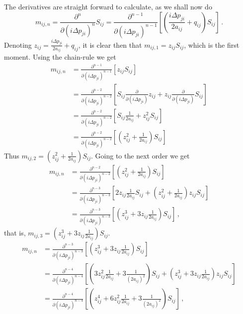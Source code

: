 \documentclass[a4paper, 11pt]{scrartcl}
\newcommand{\parenths}[1]{\left(#1\right)}
\newcommand{\sqbrackets}[1]{\left[#1\right]}
\begin{document}
The derivatives are straight forward to calculate, as we shall now do 
\begin{equation}
    m_{ij, n} = \frac{\partial^n}{\partial (i\Delta p_{ji})^n} S_{ij} 
    = \frac{\partial^{n-1}}{\partial (i\Delta p_{ji})^{n-1}} 
    \sqbrackets{\parenths{\frac{i\Delta p_{ji}}{2 a_{ij}} + q_{ij}} S_{ij}} \,.
\end{equation}
Denoting $z_{ij} = \frac{i\Delta p_{ji}}{2 a_{ij}} + q_{ij}$, it is clear then that
$m_{ij, 1} = z_{ij} S_{ij}$, which is the first moment. Using the chain-rule we get  
\begin{align}
    \nonumber
    m_{ij, n} &= \frac{\partial^{n-1}}{\partial (i\Delta p_{ji})^{n-1}} 
    \sqbrackets{z_{ij} S_{ij}} \\ 
    \nonumber
    &= \frac{\partial^{n-2}}{\partial (i\Delta p_{ji})^{n-2}}  
    \sqbrackets{ S_{ij} \frac{\partial}{\partial (i\Delta p_{ji})} z_{ij} + z_{ij} 
    \frac{\partial}{\partial (i\Delta p_{ji})}  S_{ij} } \\
    \nonumber
    &=  \frac{\partial^{n-2}}{\partial (i\Delta p_{ji})^{n-2}}  
    \sqbrackets{ S_{ij} \frac{1}{2 a_{ij}} + z^2_{ij}  S_{ij} } \\ 
    &=  \frac{\partial^{n-2}}{\partial (i\Delta p_{ji})^{n-2}}  
    \sqbrackets{ \parenths{z^2_{ij} + \frac{1}{2 a_{ij}}} S_{ij} } 
\end{align}
Thus $m_{ij, 2} = \parenths{z^2_{ij} + \frac{1}{2 a_{ij}}} S_{ij}$. Going to the 
next order we get
\begin{align}
    \nonumber
    m_{ij, n} &= \frac{\partial^{n-2}}{\partial (i\Delta p_{ji})^{n-2}} 
    \sqbrackets{ \parenths{z^2_{ij} + \frac{1}{2 a_{ij}}} S_{ij} }\\
    \nonumber
    &= \frac{\partial^{n-3}}{\partial (i\Delta p_{ji})^{n-3}} 
    \sqbrackets{ 2 z_{ij} \frac{1}{2 a_{ij}} S_{ij} + \parenths{z^2_{ij} + \frac{1}{2 a_{ij}}} z_{ij} S_{ij}} \\ 
    &= \frac{\partial^{n-3}}{\partial (i\Delta p_{ji})^{n-3}} 
    \sqbrackets{ \parenths{z^3_{ij} + 3 z_{ij} \frac{1}{2 a_{ij}}}  S_{ij}}\,, 
\end{align}
that is, $m_{ij, 3} = \parenths{z^3_{ij} + 3 z_{ij} \frac{1}{2 a_{ij}}}  S_{ij}$.
\begin{align}
    \nonumber
    m_{ij, n} &= \frac{\partial^{n-3}}{\partial (i\Delta p_{ji})^{n-3}} 
    \sqbrackets{ \parenths{z^3_{ij} + 3 z_{ij} \frac{1}{2 a_{ij}}}  S_{ij} }\\
    \nonumber
    &= \frac{\partial^{n-4}}{\partial (i\Delta p_{ji})^{n-4}} 
    \sqbrackets{ \parenths{3 z^2_{ij} \frac{1}{2 a_{ij}} + 3 \frac{1}{(2 a_{ij})^2}} S_{ij} 
    + \parenths{z^3_{ij} + 3 z_{ij} \frac{1}{2 a_{ij}}} z_{ij} S_{ij}} \\ 
    &= \frac{\partial^{n-4}}{\partial (i\Delta p_{ji})^{n-4}} 
    \sqbrackets{ \parenths{z^4_{ij} + 6 z_{ij}^2 \frac{1}{2 a_{ij}} + 3 \frac{1}{(2 a_{ij})^2}}  S_{ij}}\,, 
\end{align}
\end{document}
